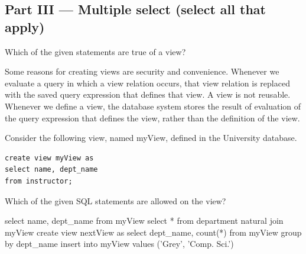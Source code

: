 \documentclass[12pt]{exam}
\begin{document}
\begin{questions}
\section*{Part III — Multiple select (select all that apply)}

\begin{minipage}{\linewidth}
\question[4]
Which of the given statements are true of a view?\par\vspace{0.5em}
\begin{checkboxes}
    \CorrectChoice Some reasons for creating views are security and convenience.
    \CorrectChoice Whenever we evaluate a query in which a view relation occurs, that view relation is replaced 
    with the saved query expression that defines that view.
    \choice A view is not reusable.
    \choice Whenever we define a view, the database system stores the result of evaluation of the query 
    expression that defines the view, rather than the definition of the view.
\end{checkboxes}
\end{minipage}\vspace{1em}

\begin{minipage}{\linewidth}
\question[6]
Consider the following view, named myView, defined in the University database.\par\vspace{0.5em}
\begin{verbatim}
create view myView as
select name, dept_name
from instructor;
\end{verbatim}
Which of the given SQL statements are allowed on the view?\par\vspace{0.5em}
\begin{checkboxes}
    \CorrectChoice select name, dept\_name from myView
    \CorrectChoice select * from department natural join myView
    \CorrectChoice create view nextView as select dept\_name, count(*) from myView group by dept\_name
    \choice insert into myView values ('Grey', 'Comp. Sci.')
\end{checkboxes}
\end{minipage}\vspace{1em}



\end{questions}
\end{document}
